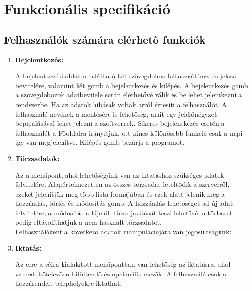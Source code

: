 \documentclass[
]{thesis-ekf}
\theoremstyle{definition}
\theoremstyle{remark}
\begin{document}
\section{Funkcionális specifikáció}
\subsection{Felhasználók számára elérhető funkciók}
\begin{enumerate}[leftmargin=0pt]
	\item \textbf{Bejelentkezés:}
	
A bejelentkezési oldalon található két szövegdoboz felhasználónév és jelszó bevitelére, valamint két gomb a bejelentkezés és kilépés. A bejelentkezés gomb a szövegdobozok adatbevitele során elérhetővé válik és be lehet jelentkezni a rendszerbe. Ha az adatok hibásak voltak arról értesíti a felhasználót. A felhasználó nevének a mentésére is lehetőség, amit egy jelölőnégyzet bepipálásával lehet jelezni a szoftvernek. Sikeres bejelentkezés esetén a felhasználót a Főoldalra irányítjuk, ott nincs különösebb funkció csak a napi ige van megjelenítve. Kilépés gomb bezárja a programot.	
	
	\item \textbf{Törzsadatok:}
	
Az a menüpont, ahol lehetőségünk van az iktatáshoz szükséges adatok felvitelére. Alapértelmezetten az összes törzsadat letöltődik a szerverről, ezeket jelenítjük meg több lista formájában és ezek alatt jelenik meg a hozzáadás, törlés és módosítás gomb. A hozzáadás lehetőséget ad új adat felvitelére, a módosítás a kijelölt törzs javítását teszi lehetővé, a törléssel pedig eltávolíthatjuk a nem használt törzsadatot. \\Felhasználóként a következő adatok manipulációjára van jogosultságunk: 

	\item \textbf{Iktatás:}

Az erre a célra kialakított menüpontban van lehetőség az iktatásra, ahol vannak kötelezően kitöltendő és opcionális mezők. A felhasználó csak a hozzárendelt telephelyekre iktathat.


\end{enumerate}
\end{document}
